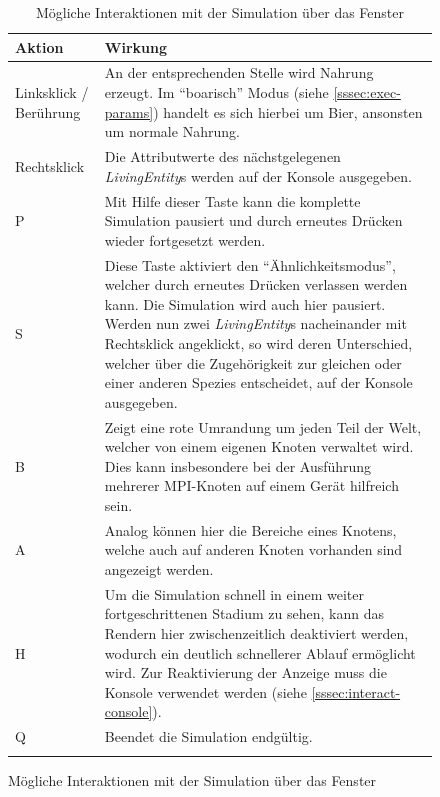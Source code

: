 \documentclass[course=erap]{aspdoc}
\begin{document}
\begin{figure}
\centering
\begin{longtable}{| p{2cm} | p{12cm} |}
\hline
Aktion & Wirkung \\
\hline
\hline
Linksklick / Berührung &
An der entsprechenden Stelle wird Nahrung erzeugt. Im "`boarisch"' Modus (siehe \ref{sssec:exec-params}) handelt es sich hierbei um Bier, ansonsten um normale Nahrung. \\
\hline
Rechtsklick &
Die Attributwerte des nächstgelegenen \emph{LivingEntity}s werden auf der Konsole ausgegeben. \\
\hline
P &
Mit Hilfe dieser Taste kann die komplette Simulation pausiert und durch erneutes Drücken wieder fortgesetzt werden.\\
\hline
S &
Diese Taste aktiviert den "`Ähnlichkeitsmodus"', welcher durch erneutes Drücken verlassen werden kann. Die Simulation wird auch hier pausiert. Werden nun zwei \emph{LivingEntity}s nacheinander mit Rechtsklick angeklickt, so wird deren Unterschied, welcher über die Zugehörigkeit zur gleichen oder einer anderen Spezies entscheidet, auf der Konsole ausgegeben.\\
\hline
B &
Zeigt eine rote Umrandung um jeden Teil der Welt, welcher von einem eigenen Knoten verwaltet wird. Dies kann insbesondere bei der Ausführung mehrerer MPI-Knoten auf einem Gerät hilfreich sein.\\
\hline
A &
Analog können hier die Bereiche eines Knotens, welche auch auf anderen Knoten vorhanden sind angezeigt werden.\\
\hline
H &
Um die Simulation schnell in einem weiter fortgeschrittenen Stadium zu sehen, kann das Rendern hier zwischenzeitlich deaktiviert werden, wodurch ein deutlich schnellerer Ablauf ermöglicht wird. Zur Reaktivierung der Anzeige muss die Konsole verwendet werden (siehe \ref{sssec:interact-console}).\\
\hline
Q &
Beendet die Simulation endgültig.\\
\hline
\caption{Mögliche Interaktionen mit der Simulation über das Fenster}
\label{table:interact-window}
\end{longtable}
\end{figure}
\end{document}
